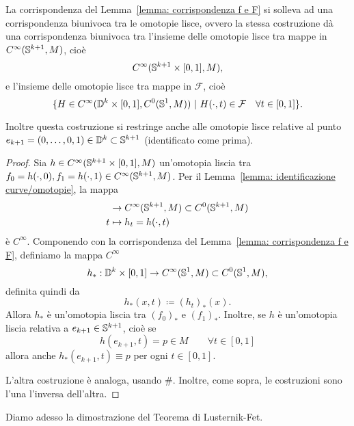 \begin{lemma}\label{lemma: corrispondenza h e H}
	La corrispondenza del Lemma~\ref{lemma: corrispondenza f e F} si solleva ad una corrispondenza biunivoca tra le omotopie lisce, ovvero la stessa costruzione dà una corrispondenza biunivoca tra l'insieme delle omotopie lisce tra mappe in \(C^\infty(\mathbb{S}^{k+1},M)\), cioè
	\[
		C^\infty(\mathbb{S}^{k+1} \times [0,1],M),
	\]
	e l'insieme delle omotopie lisce tra mappe in \(\mathcal{F}\), cioè
	\[
		\{H \in C^\infty(\mathbb{D}^k \times [0,1], C^0(\mathbb{S}^1,M)) \ | \ H(\cdot,t) \in \mathcal{F} \quad \forall t \in [0,1] \}.
	\]
	
	Inoltre questa costruzione si restringe anche alle omotopie lisce relative al punto \(e_{k+1} = (0,\dots,0,1) \in \mathbb{D}^k \subset \mathbb{S}^{k+1}\) (identificato come prima).
\end{lemma}
\begin{proof}
	Sia \(h \in C^\infty(\mathbb{S}^{k+1} \times [0,1], M)\) un'omotopia liscia tra \(f_0=h(\cdot,0), f_1 = h(\cdot, 1) \in C^\infty(\mathbb{S}^{k+1},M)\). Per il Lemma~\ref{lemma: identificazione curve/omotopie}, la mappa 
	\begin{align*}
		[0,1] &\to C^\infty(\Sp^{k+1},M) \subset C^0(\Sp^{k+1},M)\\
		t &\mapsto h_t=h(\cdot, t)
	\end{align*}
	è \(C^\infty\). Componendo con la corrispondenza del Lemma~\ref{lemma: corrispondenza f e F}, definiamo la mappa \(C^\infty\)
	\[
		h_*: \mathbb{D}^k \times [0,1] \to C^\infty(\mathbb{S}^1,M) \subset C^0(\mathbb{S}^1,M),
	\]
	definita quindi da
	\[
		h_*(x,t) \coloneq (h_t)_*(x). 
	\]
	Allora \(h_*\) è un'omotopia liscia tra \((f_0)_*\) e \((f_1)_*\). Inoltre, se \(h\) è un'omotopia liscia relativa a \(e_{k+1} \in \mathbb{S}^{k+1}\), cioè se
	\[
		h(e_{k+1},t) = p \in M \qquad \forall t \in [0,1]
	\]
	allora anche \(h_*(e_{k+1},t) \equiv p\) per ogni \(t \in [0,1]\).

	L'altra costruzione è analoga, usando \(\#\). Inoltre, come sopra, le costruzioni sono l'una l'inversa dell'altra.
\end{proof}

Diamo adesso la dimostrazione del Teorema di Lusternik-Fet.

